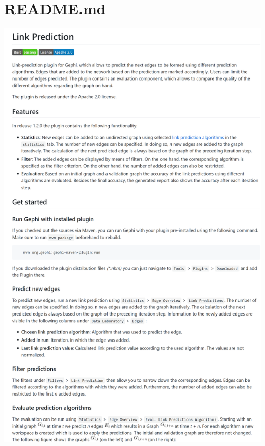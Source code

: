 \section{README.md}
\label{readme}
\includegraphics[width=\textwidth]{resources/readme_pt1.png}
\newpage
